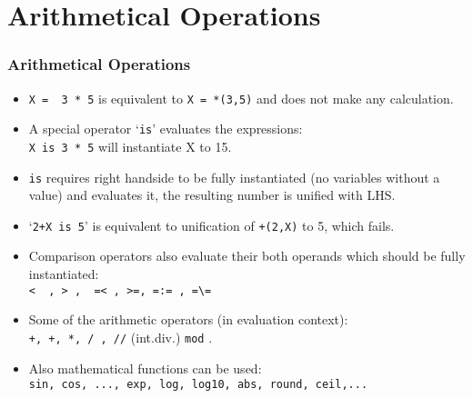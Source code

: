 \section{Arithmetical Operations}
\begin{frame}[fragile]
\frametitle{Arithmetical Operations}
\begin{itemize}
\item \lstinline!X =  3 * 5! is equivalent to \lstinline!X = *(3,5)!
    and does not make any calculation.
\item A special operator `\lstinline!is!' evaluates the expressions:\\
\lstinline!X is 3 * 5! will instantiate X to 15.
\item \lstinline!is! requires right handside to be fully instantiated (no variables without a value) and evaluates it, the resulting number is unified with LHS.
\item `\lstinline!2+X is 5!' is equivalent to unification of \lstinline!+(2,X)! to 5, which fails.
\item Comparison operators also evaluate their both operands which should be fully instantiated:\\
\lstinline!<  , > ,  =< , >=, =:= , =\=!
\item Some of the arithmetic operators (in evaluation context):\\
\lstinline!+, +, *, / , //! (int.div.) \lstinline!mod! .
\item Also mathematical functions can be used:\\
\lstinline!sin, cos, ..., exp, log, log10, abs, round, ceil,...!
\end{itemize}
\end{frame}

